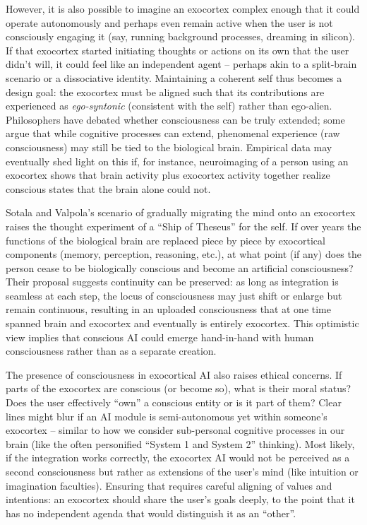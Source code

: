 \documentclass[11pt]{article}
\newcommand{\quotes}[1]{``#1''}
\begin{document}
However, it is also possible to imagine an exocortex complex enough that it could operate autonomously and perhaps even remain active when the user is not consciously engaging it (say, running background processes, dreaming in silicon). If that exocortex started initiating thoughts or actions on its own that the user didn't will, it could feel like an independent agent -- perhaps akin to a split-brain scenario or a dissociative identity. Maintaining a coherent self thus becomes a design goal: the exocortex must be aligned such that its contributions are experienced as \textit{ego-syntonic} (consistent with the self) rather than ego-alien. Philosophers have debated whether consciousness can be truly extended; some argue that while cognitive processes can extend, phenomenal experience (raw consciousness) may still be tied to the biological brain. Empirical data may eventually shed light on this if, for instance, neuroimaging of a person using an exocortex shows that brain activity plus exocortex activity together realize conscious states that the brain alone could not.

Sotala and Valpola's scenario of gradually migrating the mind onto an exocortex \cite{Sotala2012} raises the thought experiment of a \quotes{Ship of Theseus} for the self. If over years the functions of the biological brain are replaced piece by piece by exocortical components (memory, perception, reasoning, etc.), at what point (if any) does the person cease to be biologically conscious and become an artificial consciousness? Their proposal suggests continuity can be preserved: as long as integration is seamless at each step, the locus of consciousness may just shift or enlarge but remain continuous, resulting in an uploaded consciousness that at one time spanned brain and exocortex and eventually is entirely exocortex. This optimistic view implies that conscious AI could emerge hand-in-hand with human consciousness rather than as a separate creation.

The presence of consciousness in exocortical AI also raises ethical concerns. If parts of the exocortex are conscious (or become so), what is their moral status? Does the user effectively \quotes{own} a conscious entity or is it part of them? Clear lines might blur if an AI module is semi-autonomous yet within someone's exocortex -- similar to how we consider sub-personal cognitive processes in our brain (like the often personified \quotes{System 1 and System 2} thinking). Most likely, if the integration works correctly, the exocortex AI would not be perceived as a second consciousness but rather as extensions of the user's mind (like intuition or imagination faculties). Ensuring that requires careful aligning of values and intentions: an exocortex should share the user's goals deeply, to the point that it has no independent agenda that would distinguish it as an \quotes{other}.
\end{document}
